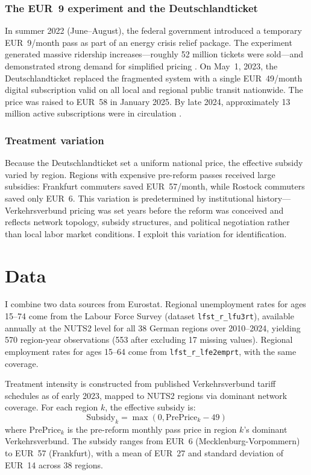 \documentclass[12pt]{article}
\begin{document}
\subsubsection*{The EUR~9 experiment and the Deutschlandticket}
In summer 2022 (June--August), the federal government introduced a temporary EUR~9/month pass as part of an energy crisis relief package. The experiment generated massive ridership increases---roughly 52 million tickets were sold---and demonstrated strong demand for simplified pricing \citep{vdv2024annual}. On May~1, 2023, the Deutschlandticket replaced the fragmented system with a single EUR~49/month digital subscription valid on all local and regional public transit nationwide. The price was raised to EUR~58 in January 2025. By late 2024, approximately 13 million active subscriptions were in circulation \citep{destatis2024}.

\subsubsection*{Treatment variation}
Because the Deutschlandticket set a uniform national price, the effective subsidy varied by region. Regions with expensive pre-reform passes received large subsidies: Frankfurt commuters saved EUR~57/month, while Rostock commuters saved only EUR~6. This variation is predetermined by institutional history---Verkehrsverbund pricing was set years before the reform was conceived and reflects network topology, subsidy structures, and political negotiation rather than local labor market conditions. I exploit this variation for identification.


\section{Data}
\label{sec:data}

I combine two data sources from Eurostat. Regional unemployment rates for ages 15--74 come from the Labour Force Survey (dataset \texttt{lfst\_r\_lfu3rt}), available annually at the NUTS2 level for all 38 German regions over 2010--2024, yielding 570 region-year observations (553 after excluding 17 missing values). Regional employment rates for ages 15--64 come from \texttt{lfst\_r\_lfe2emprt}, with the same coverage.

Treatment intensity is constructed from published Verkehrsverbund tariff schedules as of early 2023, mapped to NUTS2 regions via dominant network coverage. For each region $k$, the effective subsidy is:
\begin{equation}
\text{Subsidy}_k = \max(0, \text{PrePrice}_k - 49)
\end{equation}
where $\text{PrePrice}_k$ is the pre-reform monthly pass price in region $k$'s dominant Verkehrsverbund. The subsidy ranges from EUR~6 (Mecklenburg-Vorpommern) to EUR~57 (Frankfurt), with a mean of EUR~27 and standard deviation of EUR~14 across 38 regions.
\end{document}
